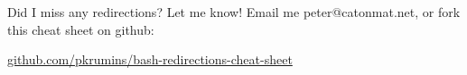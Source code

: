 \documentclass{article}
\begin{document}
\vspace{0.2in}

Did I miss any redirections? Let me know! Email me peter@catonmat.net, or fork this cheat sheet on github: \par \href{http://github.com/pkrumins/bash-redirections-cheat-sheet}{github.com/pkrumins/bash-redirections-cheat-sheet}

\vfill

\end{document}
